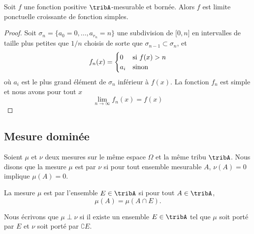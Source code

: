 \begin{proposition} \label{PropWBavIf}
    Soit \( f\) une fonction positive \( \tribA\)-mesurable et bornée. Alors \( f\) est limite ponctuelle croissante de fonction simples.
\end{proposition}

\begin{proof}
    Soit \( \sigma_n=\{ a_0=0,\ldots, a_{r_n}=n \}\) une subdivision de \( \mathopen[ 0 , n \mathclose]\) en intervalles de taille plus petites que \( 1/n\) choisis de sorte que \( \sigma_{n-1}\subset\sigma_{n}\), et
    \begin{equation}
        f_n(x)=\begin{cases}
            0    &   \text{si \( f(x)>n\)}\\
            a_i    &    \text{sinon}
        \end{cases}
    \end{equation}
    où \( a_i\) est le plus grand élément de \( \sigma_n\) inférieur à \( f(x)\). La fonction \( f_n\) est simple et nous avons pour tout \( x\)
    \begin{equation}
        \lim_{n\to \infty} f_n(x)=f(x)
    \end{equation}
\end{proof}

\subsection{Mesure dominée}

Soient \( \mu\) et \( \nu\) deux mesures sur le même espace \( \Omega\) et la même tribu \( \tribA\). Nous disons que la mesure \( \mu\) est \cite{PersoFeng} par \( \nu\) si pour tout ensemble mesurable \( A\), \( \nu(A)=0\) implique \( \mu(A)=0\).

La mesure \( \mu\) est  par l'ensemble \( E\in\tribA\) si pour tout \( A\in\tribA\), 
\begin{equation}
    \mu(A)=\mu(A\cap E).
\end{equation}

Nous écrivons que \( \mu\perp\nu\) si il existe un ensemble \( E\in\tribA\) tel que \( \mu\) soit porté par \( E\) et \( \nu\) soit porté par \( \complement E\).

